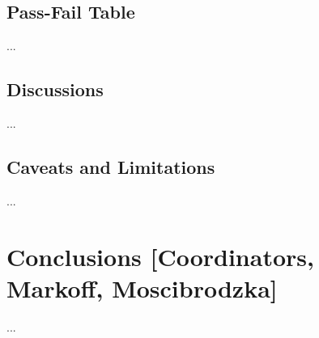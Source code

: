 \documentclass[twocolumn,tighten,dvipsnames]{aastex63}
\begin{document}





\subsection{Pass-Fail Table}
\label{sec:passfail}

...

\subsection{Discussions}
\label{sec:discussions}

...

\subsection{Caveats and Limitations}
\label{sec:caveats}

...

\section{Conclusions
  [Coordinators, Markoff, Moscibrodzka]}
\label{sec:conclusions}

...
\end{document}
